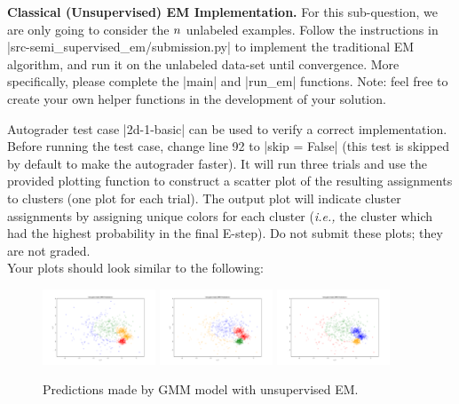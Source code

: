 \item {}
\textbf{Classical (Unsupervised) EM Implementation.}
For this sub-question, we are only going to consider the ${n}$ unlabeled examples. Follow the instructions in |src-semi_supervised_em/submission.py| to implement the traditional EM algorithm, and run it on the unlabeled data-set until convergence.
More specifically, please complete the |main| and |run_em| functions. Note: feel free to create your own helper functions in the development of your solution.

Autograder test case |2d-1-basic| can be used to verify a correct implementation. Before running the test case, change line 92 to |skip = False| (this test is skipped by default to make the autograder faster).  It will run three trials and use the provided plotting function to construct a scatter plot of the resulting assignments to clusters (one plot for each trial). The output plot will indicate cluster assignments by assigning unique colors for each cluster (\emph{i.e.,} the cluster which had the highest probability in the final E-step).  Do not submit these plots; they are not graded.\\

Your plots should look similar to the following:

  \begin{figure}[H]
    \centering
    \includegraphics[width=0.3\textwidth]{02-semi_supervised_em/pred_0.pdf}
    \includegraphics[width=0.3\textwidth]{02-semi_supervised_em/pred_1.pdf}
    \includegraphics[width=0.3\textwidth]{02-semi_supervised_em/pred_2.pdf}
    \caption{Predictions made by GMM model with unsupervised EM.}
  \end{figure}
